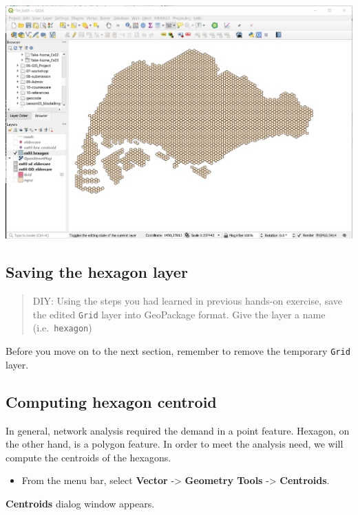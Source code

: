 \documentclass[
  letterpaper,
  DIV=11,
  numbers=noendperiod]{scrreprt}
\providecommand{\tightlist}{%
  \setlength{\itemsep}{0pt}\setlength{\parskip}{0pt}}\usepackage{longtable,booktabs,array}
\begin{document}
\includegraphics{./img09/image4.jpg}

\hypertarget{saving-the-hexagon-layer}{%
\subsection{Saving the hexagon layer}\label{saving-the-hexagon-layer}}

\begin{quote}
DIY: Using the steps you had learned in previous hands-on exercise, save
the edited \texttt{Grid} layer into GeoPackage format. Give the layer a
name (i.e.~\texttt{hexagon})
\end{quote}

Before you move on to the next section, remember to remove the temporary
\texttt{Grid} layer.

\hypertarget{computing-hexagon-centroid}{%
\subsection{Computing hexagon
centroid}\label{computing-hexagon-centroid}}

In general, network analysis required the demand in a point feature.
Hexagon, on the other hand, is a polygon feature. In order to meet the
analysis need, we will compute the centroids of the hexagons.

\begin{itemize}
\tightlist
\item
  From the menu bar, select \textbf{Vector} -\textgreater{}
  \textbf{Geometry Tools} -\textgreater{} \textbf{Centroids}.
\end{itemize}

\textbf{Centroids} dialog window appears.
\end{document}
